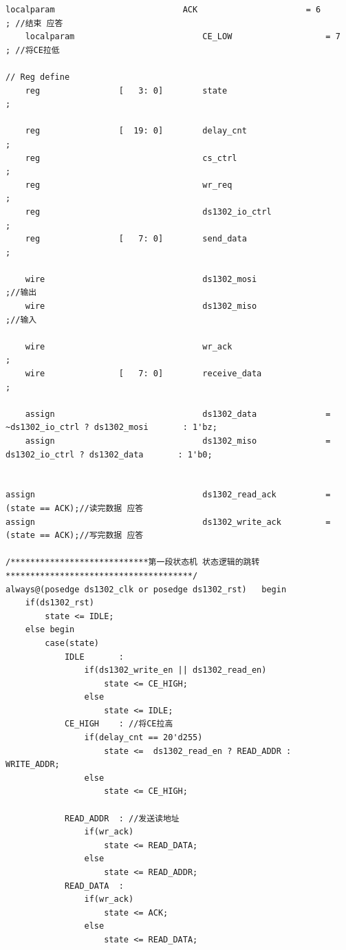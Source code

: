 \documentclass[a4paper,10pt]{article}
\begin{document}
\begin{lstlisting}[caption=ds1302_io_convert.v]
    localparam                          ACK                      = 6         ; //结束 应答
    localparam                          CE_LOW                   = 7         ; //将CE拉低

// Reg define
    reg                [   3: 0]        state                                ;

    reg                [  19: 0]        delay_cnt                            ;
    reg                                 cs_ctrl                              ;
    reg                                 wr_req                               ;
    reg                                 ds1302_io_ctrl                       ;
    reg                [   7: 0]        send_data                            ;

    wire                                ds1302_mosi                          ;//输出
    wire                                ds1302_miso                          ;//输入

    wire                                wr_ack                               ;
    wire               [   7: 0]        receive_data                         ;
    
    assign                              ds1302_data              = ~ds1302_io_ctrl ? ds1302_mosi       : 1'bz;
    assign                              ds1302_miso              =  ds1302_io_ctrl ? ds1302_data       : 1'b0;
    

assign                                  ds1302_read_ack          = (state == ACK);//读完数据 应答
assign                                  ds1302_write_ack         = (state == ACK);//写完数据 应答

/****************************第一段状态机 状态逻辑的跳转**************************************/
always@(posedge ds1302_clk or posedge ds1302_rst)   begin
    if(ds1302_rst)
        state <= IDLE;
    else begin
        case(state)
            IDLE       :
                if(ds1302_write_en || ds1302_read_en)
                    state <= CE_HIGH;
                else 
                    state <= IDLE;
            CE_HIGH    : //将CE拉高
                if(delay_cnt == 20'd255)
                    state <=  ds1302_read_en ? READ_ADDR :  WRITE_ADDR;
                else 
                    state <= CE_HIGH;

            READ_ADDR  : //发送读地址
                if(wr_ack)
                    state <= READ_DATA;
                else
                    state <= READ_ADDR;
            READ_DATA  :
                if(wr_ack)
                    state <= ACK;
                else 
                    state <= READ_DATA;


\end{lstlisting}
\end{document}
